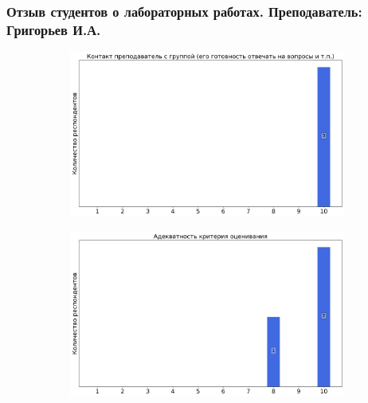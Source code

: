    \subsubsection{Отзыв студентов о лабораторных работах. Преподаватель: Григорьев И.А.}
		\begin{figure}[H]
			\centering
			\begin{subfigure}[b]{0.45\textwidth}
				\centering
				\includegraphics[width=\textwidth]{images/2 course/Радиотехнические цепи и сигналы/labniks-marks-Григорьев И.А.-0.png}
			\end{subfigure}
			\begin{subfigure}[b]{0.45\textwidth}
				\centering
				\includegraphics[width=\textwidth]{images/2 course/Радиотехнические цепи и сигналы/labniks-marks-Григорьев И.А.-1.png}
			\end{subfigure}
			\begin{subfigure}[b]{0.45\textwidth}
				\centering

\end{subfigure}
\end{figure}
